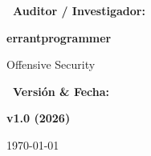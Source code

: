\documentclass[11pt,a4paper,oneside]{report}
\begin{document}
\begin{titlepage}
\begin{minipage}{0.84\textwidth}
    \vspace{4.5cm}
    
    \begin{minipage}[t]{0.48\textwidth}
      \small\color{csecDark}\textbf{\faUserShield\ Auditor / Investigador:}\par
      \vspace{2pt}
      \large\textbf{\color{csecNavy}errantprogrammer}\par
      \vspace{1pt}
      \footnotesize\color{csecMuted}Offensive Security
    \end{minipage}
    \hfill
    \begin{minipage}[t]{0.48\textwidth}
      \flushright
      \small\color{csecDark}\textbf{\faCalendar*\ Versión \& Fecha:}\par
      \vspace{2pt}
      \large\textbf{\color{csecNavy}v1.0 (2026)}\par
      \vspace{1pt}
      \footnotesize\color{csecMuted}\today
    \end{minipage}
  \end{minipage}
\end{titlepage}
\end{document}
